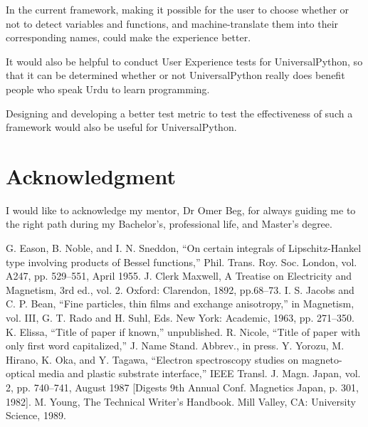 \documentclass[conference]{IEEEtran}
\begin{document}
In the current framework, making it possible for the user to choose whether or not to detect variables and functions, and machine-translate them into their corresponding names, could make the experience better.

It would also be helpful to conduct User Experience tests for UniversalPython, so that it can be determined whether or not UniversalPython really does benefit people who speak Urdu to learn programming.

Designing and developing a better test metric to test the effectiveness of such a framework would also be useful for UniversalPython.

\section*{Acknowledgment}

I would like to acknowledge my mentor, Dr Omer Beg, for always guiding me to the right path during my Bachelor's, professional life, and Master's degree.

\begin{thebibliography}{00}
 G. Eason, B. Noble, and I. N. Sneddon, ``On certain integrals of Lipschitz-Hankel type involving products of Bessel functions,'' Phil. Trans. Roy. Soc. London, vol. A247, pp. 529--551, April 1955.
 J. Clerk Maxwell, A Treatise on Electricity and Magnetism, 3rd ed., vol. 2. Oxford: Clarendon, 1892, pp.68--73.
 I. S. Jacobs and C. P. Bean, ``Fine particles, thin films and exchange anisotropy,'' in Magnetism, vol. III, G. T. Rado and H. Suhl, Eds. New York: Academic, 1963, pp. 271--350.
 K. Elissa, ``Title of paper if known,'' unpublished.
 R. Nicole, ``Title of paper with only first word capitalized,'' J. Name Stand. Abbrev., in press.
 Y. Yorozu, M. Hirano, K. Oka, and Y. Tagawa, ``Electron spectroscopy studies on magneto-optical media and plastic substrate interface,'' IEEE Transl. J. Magn. Japan, vol. 2, pp. 740--741, August 1987 [Digests 9th Annual Conf. Magnetics Japan, p. 301, 1982].
 M. Young, The Technical Writer's Handbook. Mill Valley, CA: University Science, 1989.
\end{thebibliography}
\vspace{12pt}
\end{document}
